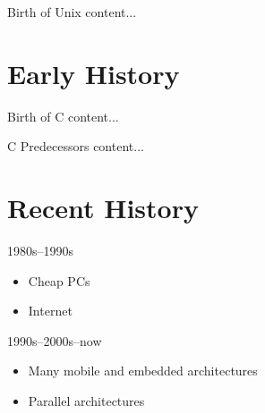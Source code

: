 \documentclass[xetex,aspectratio=149]{beamer}
\begin{document}
\begin{frame}{Birth of Unix}
	content...
\end{frame}

\section{Early History}

\begin{frame}{Birth of C}
	content...
\end{frame}

\begin{frame}{C Predecessors}
	content...
\end{frame}

\section{Recent History}

\begin{frame}{1980s--1990s}
	\begin{itemize}
	\item Cheap PCs
	\item Internet
	\end{itemize}
\end{frame}

\begin{frame}{1990s--2000s--now}
	\begin{itemize}
		\item Many mobile and embedded architectures
		\item Parallel architectures
	\end{itemize}
\end{frame}


\byebye
\end{document}
